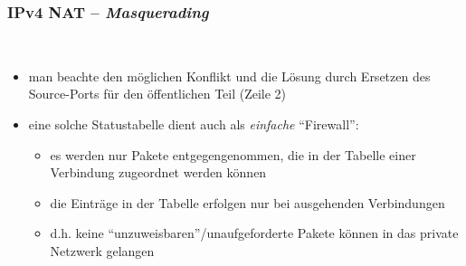 \documentclass[ignorenonframetext]{beamer}
\begin{document}
\begin{frame}
\frametitle{IPv4 NAT -- {\em Masquerading}}
\begin{itemize}

  \item man beachte den m\"oglichen Konflikt und die L\"osung durch Ersetzen des Source-Ports f\"ur den \"offentlichen Teil (Zeile 2)

  \item eine solche Statustabelle dient auch als {\em einfache} ``Firewall'':

  \begin{itemize}
     \item es werden nur Pakete entgegengenommen, die in der Tabelle einer Verbindung zugeordnet werden k\"onnen
     \item die Eintr\"age in der Tabelle erfolgen nur bei ausgehenden Verbindungen
     \item d.h. keine ``unzuweisbaren''/unaufgeforderte Pakete k\"onnen in das private Netzwerk gelangen

   \end{itemize}

\end{itemize}
\end{frame}
\end{document}
